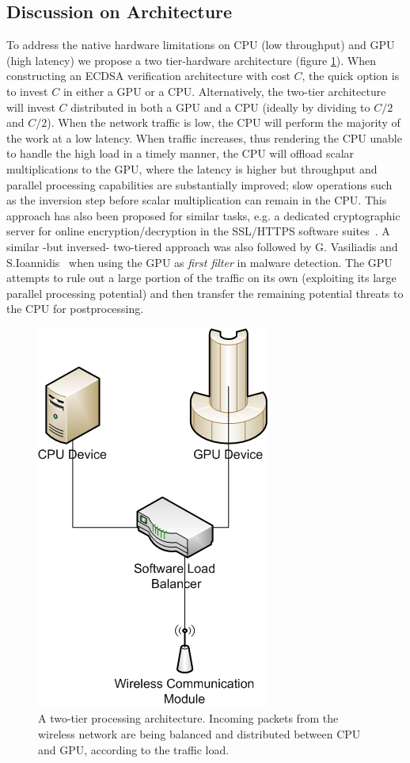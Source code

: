 \documentclass[11pt,twocolumn]{IEEEtran}
\begin{document}
\subsection{Discussion on Architecture}\label{arch}
To address the native hardware limitations on CPU (low throughput) and GPU (high latency) we propose a two tier-hardware architecture (figure \ref{2tier}). When constructing an ECDSA verification architecture with cost $C$, the quick option is to invest $C$ in either a GPU or a CPU. Alternatively, the two-tier architecture will invest $C$ distributed in both a GPU and a CPU (ideally by dividing to $C/2$ and $C/2$). When the network traffic is low, the CPU will perform the majority of the work at a low latency. When traffic increases, thus rendering the CPU unable to handle the high load in a timely manner, the CPU will offload scalar multiplications to the GPU, where the latency is higher but throughput and parallel processing capabilities are substantially improved; slow operations such as the inversion step before scalar multiplication can remain in the CPU. This approach has also been proposed for similar tasks, e.g. a dedicated cryptographic server for online encryption/decryption in the  SSL/HTTPS software suites~\cite{kaist}. A similar -but inversed- two-tiered approach was also followed by G. Vasiliadis and S.Ioannidis~\cite{gravity} when using the GPU as \emph{first filter} in malware detection. The GPU attempts to rule out a large portion of the traffic on its own (exploiting its large parallel processing potential) and then transfer the remaining potential threats to the CPU for postprocessing.\\
\begin{figure}
\centering
\includegraphics[scale=0.45]{2tier}
\caption{A two-tier processing architecture. Incoming packets from the wireless network are being balanced and distributed between CPU and GPU, according to the traffic load.}
\label{2tier}
\end{figure}
\end{document}
